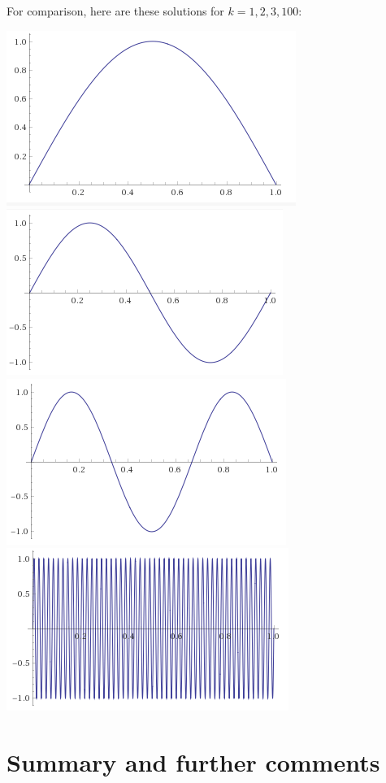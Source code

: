 \documentclass[10pt]{amsart}
\theoremstyle{mythm}
\theoremstyle{definition}
\theoremstyle{myrmk}
\begin{document}
	For comparison, here are these solutions for $k = 1, 2, 3, 100$: 
	\begin{center}
		\includegraphics{rec11-pic4}
		\includegraphics{rec11-pic5}
		\includegraphics{rec11-pic6}
		\includegraphics{rec11-pic7}
	\end{center}
	
	\section{Summary and further comments} 
\end{document}
